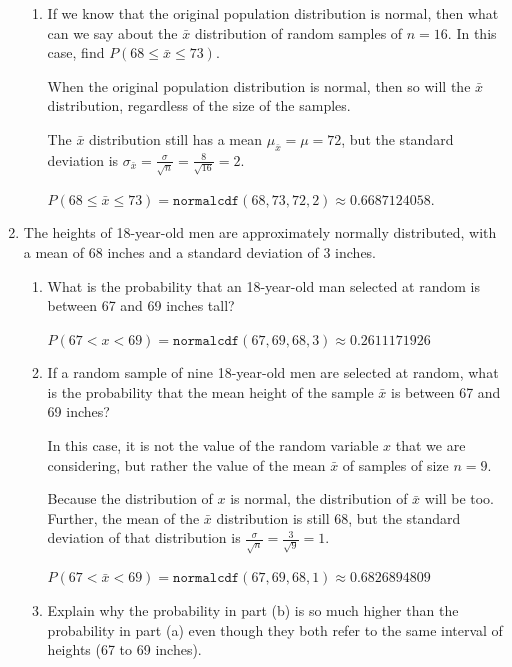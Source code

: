 \documentclass{article}
\newcommand{\answer}[1]{\color{red}#1}
\begin{document}
\begin{enumerate}
\begin{enumerate}
	\item If we know that the original population distribution is normal, then what can we say about the $\bar x$ distribution of random samples of $n=16$.  In this case, find $P(68 \leq \bar x \leq 73)$. 
	
	{\answer When the original population distribution is normal, then so will the $\bar{x}$ distribution, regardless of the size of the samples. 
	
	The $\bar{x}$ distribution still has a mean $\mu_{\bar{x}} = \mu = 72$, but the standard deviation is $\sigma_{\bar{x}} = \frac{\sigma}{\sqrt{n}} =\frac{8}{\sqrt{16}} = 2$. 
	
	$P(68 \leq \bar{x} \leq 73) = \texttt{normalcdf}(68, 73, 72, 2) \approx 0.6687124058$.
	} 
	
	\end{enumerate}
	
\item The heights of 18-year-old men are approximately normally distributed, with a mean of 68 inches and a standard deviation of 3 inches.

	\begin{enumerate}
	
	\item What is the probability that an 18-year-old man selected at random is between 67 and 69 inches tall? 
	
	{\answer $P(67 < x < 69) = \texttt{normalcdf}(67, 69, 68, 3) \approx 0.2611171926$
	} 

	\item If a random sample of nine 18-year-old men are selected at random, what is the probability that the mean height of the sample $\bar x$ is between 67 and 69 inches? 
	
	{\answer  In this case, it is not the value of the random variable $x$ that we are considering, but rather the value of the mean $\bar{x}$ of samples of size $n = 9$.  
	
	Because the distribution of $x$ is normal, the distribution of $\bar{x}$ will be too.  Further, the mean of the $\bar{x}$ distribution is still 68, but the standard deviation of that distribution is $\frac{\sigma}{\sqrt{n}} = \frac{3}{\sqrt{9}} = 1$. 
	
	$P(67 < \bar{x} < 69) = \texttt{normalcdf}(67, 69, 68, 1) \approx 0.6826894809$
	} 

	\item Explain why the probability in part (b) is so much higher than the probability in part (a) even though they both refer to the same interval of heights (67 to 69 inches). 
	

\end{enumerate}
\end{enumerate}
\end{document}
